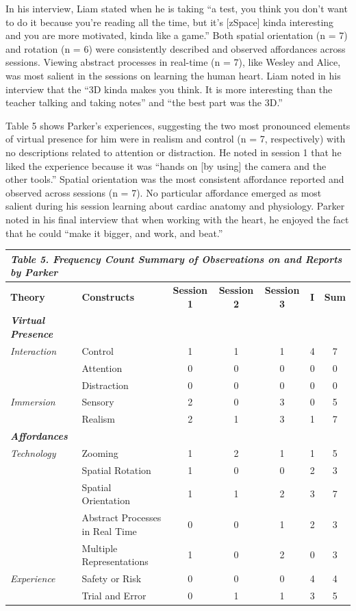 \documentclass[11.5pt]{sig-alternate} %
\begin{document}
\begin{large}
In his interview, Liam stated when he is taking “a test, you think you don’t want to do it because you’re reading all the time, but it’s [zSpace] kinda interesting and you are more motivated, kinda like a game.” Both spatial orientation (n = 7) and rotation (n = 6) were consistently described and observed affordances across sessions. Viewing abstract processes in real-time (n = 7), like Wesley and Alice, was most salient in the sessions on learning the human heart. Liam noted in his interview that the “3D kinda makes you think. It is more interesting than the teacher talking and taking notes” and “the best part was the 3D.”


Table 5 shows Parker’s experiences, suggesting the two most pronounced elements of virtual presence for him were in realism and control (n = 7, respectively) with no descriptions related to attention or distraction. He noted in session 1 that he liked the experience because it was “hands on [by using] the camera and the other tools.” Spatial orientation was the most consistent affordance reported and observed across sessions (n = 7). No particular affordance emerged as most salient during his session learning about cardiac anatomy and physiology. Parker noted in his final interview that when working with the heart, he enjoyed the fact that he could “make it bigger, and work, and beat.”

\begin{table}
\begin{tabular}[h]{llccccc}
\hline
\multicolumn{7}{l}{\textit{\textbf{Table 5.} Frequency Count Summary of Observations on and Reports by Parker}} \\
\hline
\textbf{Theory} & \textbf{Constructs} & \textbf{Session 1} & \textbf{Session 2} & \textbf{Session 3} & \textbf{I} & \textbf{Sum} \\
\hline
\textit{\textbf{Virtual Presence}} &  & & & & & \\
\textit{Interaction} & Control & 1 & 1 & 1 & 4 & 7 \\
 & Attention & 0 & 0 & 0 & 0 & 0 \\
 & Distraction & 0 & 0 & 0 & 0 & 0 \\
\textit{Immersion} & Sensory & 2 & 0 & 3 & 0 & 5 \\
 & Realism & 2 & 1 & 3 & 1 & 7 \\
\hline
\textit{\textbf{Affordances}} & & & & & & \\
\textit{Technology} & Zooming & 1 & 2 & 1 & 1 & 5 \\
 & Spatial Rotation & 1 & 0 & 0 & 2 & 3 \\
 & Spatial Orientation & 1 & 1 & 2 & 3 & 7 \\
 & Abstract Processes in Real Time & 0 & 0 & 1 & 2 & 3 \\
 & Multiple Representations & 1 & 0 & 2 & 0 & 3 \\
\textit{Experience} & Safety or Risk & 0 & 0 & 0 & 4 & 4 \\
 & Trial and Error & 0 & 1 & 1 & 3 & 5 \\
\hline
\end{tabular}
\end{table}


\end{large}
\end{document}
